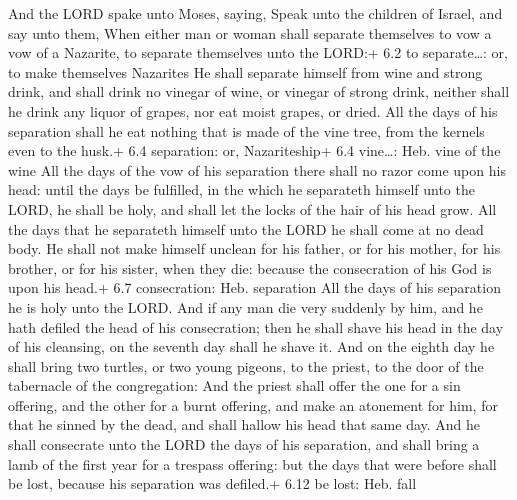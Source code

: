  And the LORD spake unto Moses, saying,  Speak
unto the children of Israel, and say unto them, When either man or woman
shall separate themselves to vow a vow of a Nazarite, to separate
themselves unto the LORD:+ 6.2 to separate\ldots: or, to make themselves
Nazarites  He shall separate himself from wine and strong
drink, and shall drink no vinegar of wine, or vinegar of strong drink,
neither shall he drink any liquor of grapes, nor eat moist grapes, or
dried.  All the days of his separation shall he eat nothing
that is made of the vine tree, from the kernels even to the husk.+ 6.4
separation: or, Nazariteship+ 6.4 vine\ldots: Heb. vine of the wine
 All the days of the vow of his separation there shall no
razor come upon his head: until the days be fulfilled, in the which he
separateth himself unto the LORD, he shall be holy, and shall let the
locks of the hair of his head grow.  All the days that he
separateth himself unto the LORD he shall come at no dead body.
 He shall not make himself unclean for his father, or for
his mother, for his brother, or for his sister, when they die: because
the consecration of his God is upon his head.+ 6.7 consecration: Heb.
separation  All the days of his separation he is holy unto
the LORD.  And if any man die very suddenly by him, and he
hath defiled the head of his consecration; then he shall shave his head
in the day of his cleansing, on the seventh day shall he shave it.
 And on the eighth day he shall bring two turtles, or two
young pigeons, to the priest, to the door of the tabernacle of the
congregation:  And the priest shall offer the one for a sin
offering, and the other for a burnt offering, and make an atonement for
him, for that he sinned by the dead, and shall hallow his head that same
day.  And he shall consecrate unto the LORD the days of his
separation, and shall bring a lamb of the first year for a trespass
offering: but the days that were before shall be lost, because his
separation was defiled.+ 6.12 be lost: Heb. fall

